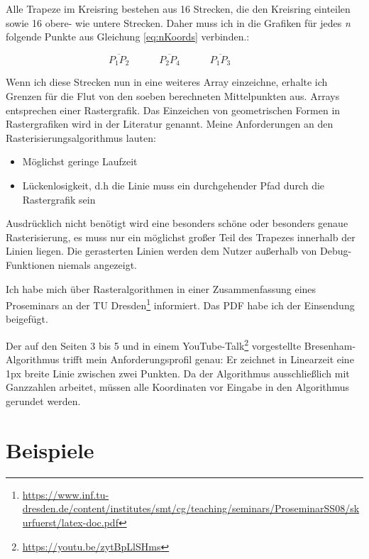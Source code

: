	Alle Trapeze im Kreisring bestehen aus 16 Strecken, die den Kreisring einteilen sowie 16 obere- wie untere Strecken. Daher muss ich in die Grafiken für jedes \textit{n} folgende Punkte aus Gleichung \eqref{eq:nKoords} verbinden.:
	
	\begin{equation}
		\overline{P_1P_2} \hspace{3em}
		\overline{P_2P_4} \hspace{3em}
		\overline{P_1P_3} \hspace{3em}
	\end{equation}

	Wenn ich diese Strecken nun in eine weiteres Array einzeichne, erhalte ich Grenzen für die Flut von den soeben berechneten Mittelpunkten aus. Arrays entsprechen einer Rastergrafik. Das Einzeichen von geometrischen Formen in Rastergrafiken wird in der Literatur  genannt. Meine Anforderungen an den Rasterisierungsalgorithmus lauten:
	\begin{itemize}
		\item Möglichst geringe Laufzeit
		\item Lückenlosigkeit, d.h die Linie muss ein durchgehender Pfad durch die Rastergrafik sein
	\end{itemize}
	Ausdrücklich nicht benötigt wird eine besonders schöne oder besonders genaue Rasterisierung, es muss nur ein möglichst großer Teil des Trapezes innerhalb der Linien liegen. Die gerasterten Linien werden dem Nutzer außerhalb von Debug-Funktionen niemals angezeigt.

	Ich habe mich über Rasteralgorithmen in einer Zusammenfassung eines Proseminars an der TU Dresden\footnote{\url{https://www.inf.tu-dresden.de/content/institutes/smt/cg/teaching/seminars/ProseminarSS08/skurfuerst/latex-doc.pdf}} informiert. Das PDF habe ich der Einsendung beigefügt.
	
	Der auf den Seiten 3 bis 5 und in einem YouTube-Talk\footnote{\url{https://youtu.be/zytBpLlSHms}} vorgestellte Bresenham-Algorithmus trifft mein Anforderungsprofil genau: Er zeichnet in Linearzeit eine 1px breite Linie zwischen zwei Punkten. Da der Algorithmus ausschließlich mit Ganzzahlen arbeitet, müssen alle Koordinaten vor Eingabe in den Algorithmus gerundet werden.
\section{Beispiele}